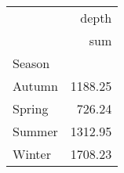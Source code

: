 \begin{tabular}{lr}
\toprule
{} &    depth \\
{} &      sum \\
Season &          \\
\midrule
Autumn &  1188.25 \\
Spring &   726.24 \\
Summer &  1312.95 \\
Winter &  1708.23 \\
\bottomrule
\end{tabular}
